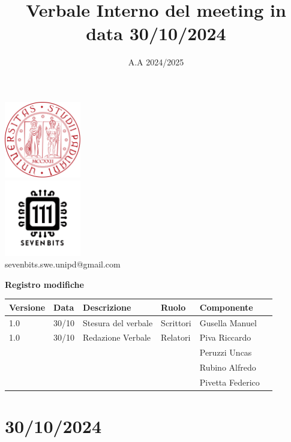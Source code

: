 \documentclass[12pt]{article}
\title{Verbale Interno del meeting in data 30/10/2024}
\date{A.A 2024/2025}
\begin{document}
\maketitle
\begin{center}
\includegraphics[width=0.25\textwidth]{LogoUnipd}\\
\includegraphics[width=0.25\textwidth]{Sevenbitslogo}\\
sevenbits.swe.unipd@gmail.com\\
\vspace{2mm}

\textbf{Registro modifiche}\\
\vspace{2mm}
\begin{tabular}{|l|l|l|l|l|l|}
\hline
\textbf{Versione} & \textbf{Data} & \textbf{Descrizione} & \textbf{Ruolo} & \textbf{Componente} \\
\hline
1.0 & 30/10 & Stesura del verbale & Scrittori & Gusella Manuel\\
\hline
1.0 & 30/10 & Redazione Verbale & Relatori &  Piva Riccardo\\
& & & & Peruzzi Uncas\\
& & & & Rubino Alfredo\\
& & & & Pivetta Federico\\
\hline
\end{tabular}
\end{center}

\tableofcontents
\newpage
\section{30/10/2024}
\end{document}
